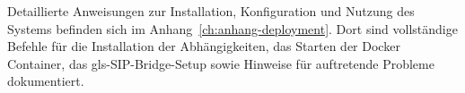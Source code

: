 Detaillierte Anweisungen zur Installation, Konfiguration und Nutzung des Systems befinden sich im Anhang~\ref{ch:anhang-deployment}. Dort sind vollständige Befehle für die Installation der Abhängigkeiten, das Starten der Docker Container, das \gls{gls-SIP}-Bridge-Setup sowie Hinweise für auftretende Probleme dokumentiert.
